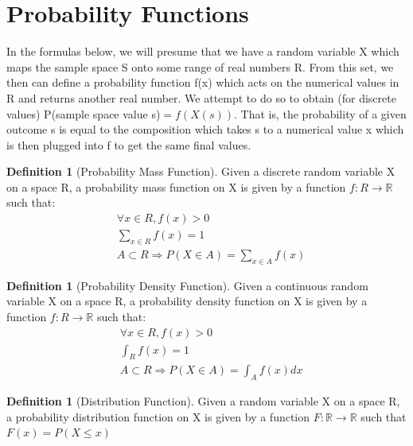 \documentclass[10pt,]{book}
\theoremstyle{plain}
\theoremstyle{definition}
\newtheorem{definition}[theorem]{Definition}
\theoremstyle{definition}
\numberwithin{equation}{section}
\newcommand{\gt}{ > }
\begin{document}
\section[Probability Functions]{Probability Functions}\label{ProbabilityFunctions}
In the formulas below, we will presume that we have a random variable X which maps the sample space S onto some range of real numbers R.  From
this set, we then can define a probability function f(x) which acts on the numerical values in R and returns another real number.  We attempt to do so 
to obtain (for discrete values) P(sample space value s)\( = f(X(s))\).  That is, the probability of a given outcome s is equal to the composition 
which takes s to a numerical value x which is then plugged into f to get the same final values.%
\begin{definition}[Probability Mass Function]\label{definition-10}
Given a discrete random variable X on a space R, a probability mass function on X is given by a function \(f:R \rightarrow \mathbb{R}\) such that:
		\begin{align*}
& \forall x \in R , f(x) \gt 0\\
& \sum_{x \in R} f(x) = 1\\
& A \subset R \Rightarrow P(X \in A) = \sum_{x \in A}f(x)
\end{align*}\end{definition}
\begin{definition}[Probability Density Function]\label{definition-11}
Given a continuous random variable X on a space R, a probability density function on X is given by a function \(f:R \rightarrow \mathbb{R}\) such that:
			\begin{align*}
& \forall x \in R , f(x) \gt 0\\
& \int_{R} f(x) = 1\\
& A \subset R \Rightarrow P(X \in A) = \int_{A} f(x) dx
\end{align*}\end{definition}
\begin{definition}[Distribution Function]\label{definition-12}
Given a random variable X on a space R, a probability distribution function on X is given by a function 
				   \(F:\mathbb{R} \rightarrow \mathbb{R}\) such that \(\displaystyle F(x)=P(X \le x)\)\end{definition}
\typeout{************************************************}
\typeout{************************************************}
\end{document}

